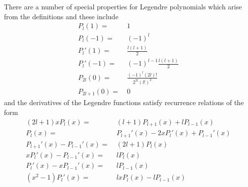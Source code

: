 \documentclass[a4paper]{article}
\numberwithin{equation}{section}
\begin{document}
There are a number of special properties for Legendre polynomials which arise from the definitions and these include
\begin{align}
{P_l}\left( 1 \right) =&\ 1\\
{P_l}\left( { - 1} \right) =&\ {\left( { - 1} \right)^l}\\
{P_l}'\left( 1 \right) =&\ \frac{{l\left( {l + 1} \right)}}{2}\\
{P_l}'\left( { - 1} \right) =&\ {\left( { - 1} \right)^{l - 1}}\frac{{l\left( {l + 1} \right)}}{2}\\
{P_{2l}}\left( 0 \right) =&\ \frac{{{{\left( { - 1} \right)}^l}\left( {2l} \right)!}}{{{2^{2l}}{{\left( {l!} \right)}^2}}}\\
{P_{2l + 1}}\left( 0 \right) =&\ 0
\end{align}
and the derivatives of the Legendre functions satisfy recurrence relations of the form
\begin{align}
\left( {2l + 1} \right)x{P_l}\left( x \right) =&\ \left( {l + 1} \right){P_{l + 1}}\left( x \right) + l{P_{l - 1}}\left( x \right)\\
{P_l}\left( x \right) =&\ {P_{l + 1}}'\left( x \right) - 2x{P_l}'\left( x \right) + {P_{l - 1}}'\left( x \right)\\
{P_{l + 1}}'\left( x \right) - {P_{l - 1}}'\left( x \right) =&\ \left( {2l + 1} \right){P_l}\left( x \right) \label{3.33}\\
x{P_l}'\left( x \right) - {P_{l - 1}}'\left( x \right) =&\ l{P_l}\left( x \right)\\
{P_l}'\left( x \right) - x{P_{l - 1}}'\left( x \right) =&\ l{P_{l - 1}}\left( x \right)\\
\left( {{x^2} - 1} \right){P_l}'\left( x \right) =&\ lx{P_l}\left( x \right) - l{P_{l - 1}}\left( x \right)
\end{align}
\end{document}
